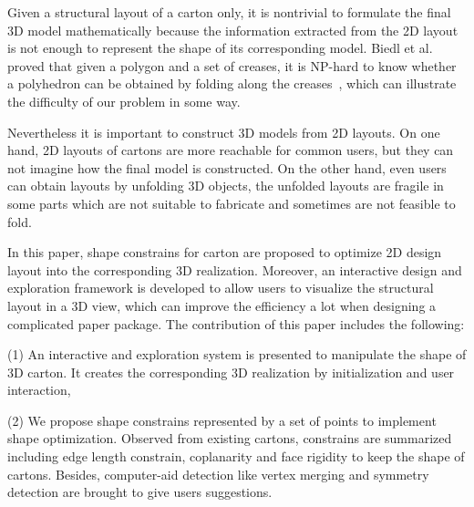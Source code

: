 Given a structural layout of a carton only, it is nontrivial to formulate the final 3D model mathematically because the information extracted from the 2D layout is not enough to represent the shape of its corresponding model. 
Biedl et al. proved that given a polygon and a set of creases, it is NP-hard to know whether a polyhedron can be obtained by folding along the creases~\cite{Biedl:2005:NFP:1090462.1646553}, which can illustrate the difficulty of our problem in some way. 
		
Nevertheless it is important to construct 3D models from 2D layouts. 
On one hand, 2D layouts of cartons are more reachable for common users, but they can not imagine how the final model is constructed. On the other hand, even users can obtain layouts by unfolding 3D objects, the unfolded layouts are fragile in some parts which are not suitable to fabricate and sometimes are not feasible to fold.


In this paper, shape constrains for carton are proposed to optimize 2D design layout into the corresponding 3D realization. 
Moreover, an interactive design and exploration framework is developed to allow users to visualize the structural layout in a 3D view, which can improve the efficiency a lot when designing a complicated paper package. The contribution of this paper includes the following:

(1) An interactive and exploration system is presented to manipulate the shape of 3D carton. It creates the corresponding 3D realization by initialization and user interaction, {\color{blue}{and users are allowed to edit the 3D model to explore deformed layouts automatically.}}

(2) We propose shape constrains represented by a set of points to implement shape optimization. Observed from existing cartons, constrains are summarized including edge length constrain, coplanarity and face rigidity to keep the shape of cartons. Besides, computer-aid detection like vertex merging and symmetry detection are brought to give users suggestions. 